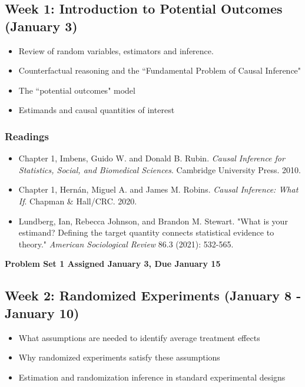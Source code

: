 \documentclass[11pt, article, oneside]{memoir}
\theoremstyle{Assumption}
\begin{document}
\subsection{Week 1: Introduction to Potential Outcomes (January 3)}

\begin{itemize}
  \item Review of random variables, estimators and inference.
  \item Counterfactual reasoning and the ``Fundamental Problem of Causal Inference"
  \item The ``potential outcomes" model
  \item Estimands and causal quantities of interest
\end{itemize}

\subsubsection*{Readings}

\begin{itemize}
\item Chapter 1, Imbens, Guido W. and Donald B. Rubin. \emph{Causal Inference for Statistics, Social, and Biomedical Sciences}. Cambridge University Press.  2010.
\item Chapter 1, Hern\'an, Miguel A. and  James M. Robins. \emph{Causal Inference: What If}.  Chapman \& Hall/CRC. 2020.
\item Lundberg, Ian, Rebecca Johnson, and Brandon M. Stewart. "What is your estimand? Defining the target quantity connects statistical evidence to theory." \textit{American Sociological Review} 86.3 (2021): 532-565.
\end{itemize}

\textbf{Problem Set 1 Assigned January 3, Due January 15}

\subsection{Week 2: Randomized Experiments (January 8 - January 10)}

\begin{itemize}
\item What assumptions are needed to identify average treatment effects
\item Why randomized experiments satisfy these assumptions
\item Estimation and randomization inference in standard experimental designs
\end{itemize}
\end{document}
